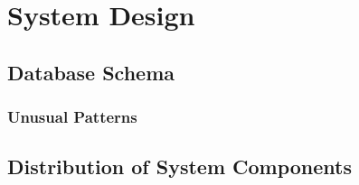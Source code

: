 \section{System Design}

\subsection{Database Schema}

\subsubsection{Unusual Patterns}

\subsection{Distribution of System Components}




